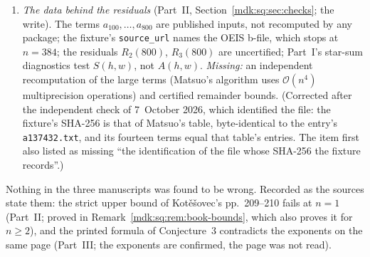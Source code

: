 \documentclass[11pt,letterpaper]{article}
\numberwithin{equation}{section}
\theoremstyle{remark}\newtheorem{remark}[theorem]{Remark}
\newcommand{\Oh}{\mathcal O}\newcommand{\Q}{\mathbb Q}\newcommand{\N}{\mathbb N}\newcommand{\R}{\mathbb R}
\newcommand{\file}[1]{\nolinkurl{#1}}
\begin{document}
\begin{enumerate}[leftmargin=1.6em]
\item\label{mdk:q:data} \emph{The data behind the residuals} (Part~II, Section~\ref{mdk:sq:sec:checks}; the write). The terms $a_{100},\dots,a_{800}$ are published inputs, not recomputed by any package; the fixture's \texttt{source\_url} names the OEIS b-file, which stops at $n=384$; the residuals $R_2(800)$, $R_3(800)$ are uncertified; Part~I's star-sum diagnostics test $S(h,w)$, not $A(h,w)$. \emph{Missing:} an independent recomputation of the large terms (Matsuo's algorithm uses $\Oh(n^4)$ multiprecision operations) and certified remainder bounds. \textup{(Corrected after the independent check of 7~October 2026, which identified the file: the fixture's SHA-256 is that of Matsuo's table, byte-identical to the entry's \file{a137432.txt}, and its fourteen terms equal that table's entries. The item first also listed as missing ``the identification of the file whose SHA-256 the fixture records''.)}
\end{enumerate}
Nothing in the three manuscripts was found to be wrong. Recorded as the sources state them: the strict upper bound of Kot\v e\v sovec's pp.~209--210 fails at $n=1$ (Part~II; proved in Remark~\ref{mdk:sq:rem:book-bounds}, which also proves it for $n\ge2$), and the printed formula of Conjecture~3 contradicts the exponents on the same page (Part~III; the exponents are confirmed, the page was not read).
\end{document}
